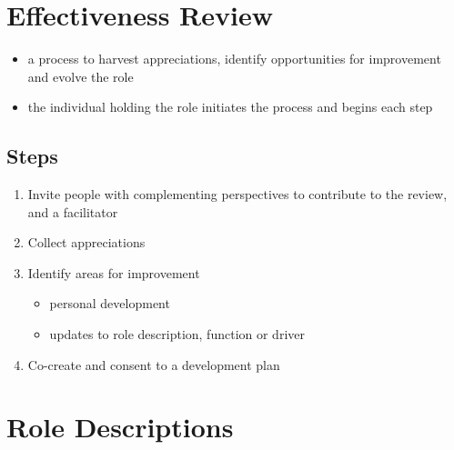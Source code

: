 \section{Effectiveness Review}
\label{effectivenessreview}

\begin{itemize}
\item a process to harvest appreciations, identify opportunities for improvement and evolve the role

\item the individual holding the role initiates the process and begins each step

\end{itemize}

\subsection{Steps}
\label{steps}

\begin{enumerate}
\item Invite people with complementing perspectives to contribute to the review, and a facilitator

\item Collect appreciations

\item Identify areas for improvement

\begin{itemize}
\item personal development

\item updates to role description, function or driver

\end{itemize}

\item Co-create and consent to a development plan

\end{enumerate}

\section{Role Descriptions}
\label{roledescriptions}


